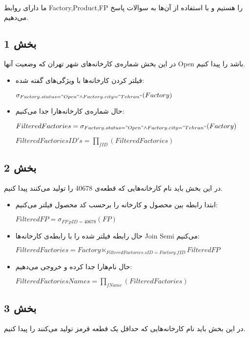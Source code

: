 ما دارای روابط Factory,Product,FP را هستیم و با استفاده از آن‌ها به سوالات پاسخ می‌دهیم.
\subsection*{بخش 1}
در این بخش شماره‌ی کارخانه‌های شهر تهران که‌ وضعیت آنها Open  باشد را پیدا کنیم.
\begin{itemize}	
	\item فیلتر کردن کارخانه‌ها با ویژگی‌های گفته شده:
	
	\setLTR
	
	$\sigma_{Factory.status="Open" \land Factory.city="Tehran"} (Factory)$
	\setRTL
	
	\item
	حال شماره‌ی کارخانه‌هارا جدا می‌کنیم:
	\setLTR

	$FilteredFactories = \sigma_{Factory.status="Open" \land Factory.city="Tehran"} (Factory)$
	
	$FilteredFactoriesID's = \prod_{fID} (FilteredFactories)$
	\setRTL



\end{itemize}


\subsection*{بخش 2}
در این بخش باید نام کارخانه‌هایی که قطعه‌ی 40678 را تولید می‌کنند پیدا کنیم.
\begin{itemize}	
	
\item ابتدا رابطه بین محصول و کارخانه را برحسب کد محصول فیلتر می‌کنیم:

\setLTR

$FilteredFP = \sigma_{FP.pID = 40678}(FP)$
\setRTL

\item حال رابطه فیلتر شده را با رابطه‌ی کارخانه‌‌ها Join Semi می‌کنیم:

\setLTR

$FilteredFactories = Factory \ltimes_{FilteredFactories.sID = Factory.fID}FilteredFP$
\setRTL


\item حال نام‌هارا جدا کرده و خروجی می‌دهیم:

\setLTR

$FilteredFactoriesNames = \prod _{fName}(FilteredFactories) $
\setRTL

\end{itemize}

\subsection*{بخش 3}
در این بخش باید نام کارخانه‌هایی که حداقل یک قطعه قرمز تولید می‌کنند را پیدا کنیم.

